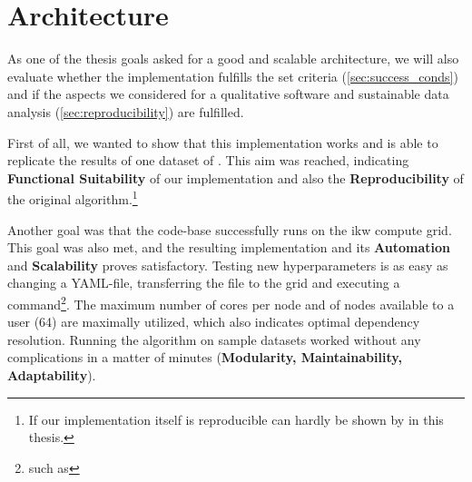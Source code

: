 












\section{Architecture}

As one of the thesis goals asked for a good and scalable architecture, we will also evaluate whether the implementation fulfills the set criteria (\autoref{sec:success_conds}) and if the aspects we considered for a qualitative software and sustainable data analysis (\autoref{sec:reproducibility}) are fulfilled.

First of all, we wanted to show that this implementation works and is able to replicate the results of one dataset of \mainalgos. This aim was reached, indicating \textbf{Functional Suitability} of our implementation and also the \textbf{Reproducibility} of the original algorithm.\footnote{If our implementation itself is reproducible can hardly be shown by \me in this thesis.}

Another goal was that the code-base successfully runs on the \gls{ikw} compute grid. This goal was also met, and the resulting implementation and its \textbf{Automation} and \textbf{Scalability} proves satisfactory. Testing new hyperparameters is as easy as changing a YAML-file, transferring the file to the grid and executing a command\footnote{such as }. The maximum number of cores per node and of nodes available to a user (64) are maximally utilized, which also indicates optimal dependency resolution. Running the algorithm on sample datasets worked without any complications in a matter of minutes (\textbf{Modularity, Maintainability, Adaptability}).

